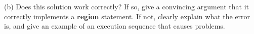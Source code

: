 \documentclass[12pt]{article}
\begin{document}
\begin{enumerate}
\begin{minipage}{2.75in}
(b) Does this solution work correctly?  If so, give a
convincing argument that it correctly implements a {\bf region}
statement.  If not, clearly explain what the error is, and give an
example of an execution sequence that causes problems.
\end{minipage}



\end{enumerate}
\end{document}
